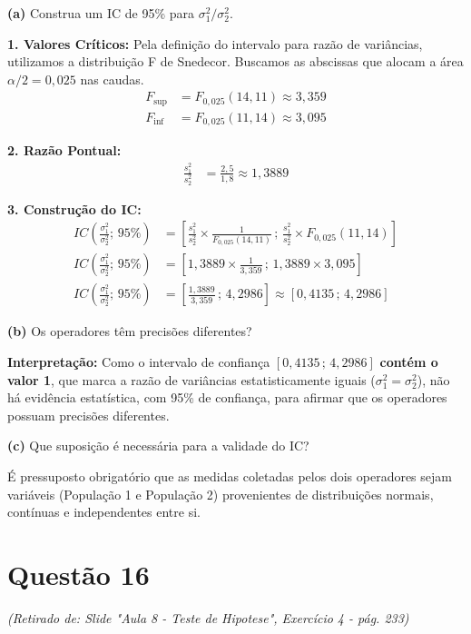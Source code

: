 \documentclass[12pt, a4paper]{article}
\begin{document}
\medskip\noindent\textbf{(a)} Construa um IC de 95\% para $\sigma^2_1 / \sigma^2_2$.

\noindent \textbf{1. Valores Críticos:} Pela definição do intervalo para razão de variâncias, utilizamos a distribuição F de Snedecor. Buscamos as abscissas que alocam a área $\alpha/2 = 0{,}025$ nas caudas.
\begin{align*}
F_{\text{sup}} &= F_{0{,}025}(14, 11) \approx 3{,}359 \\
F_{\text{inf}} &= F_{0{,}025}(11, 14) \approx 3{,}095
\end{align*}

\noindent \textbf{2. Razão Pontual:}
\begin{align*}
\frac{s^2_1}{s^2_2} &= \frac{2{,}5}{1{,}8} \approx \boxed{1{,}3889}
\end{align*}

\noindent \textbf{3. Construção do IC:}
\begin{align*}
IC\left(\frac{\sigma_1^2}{\sigma_2^2}; \, 95\%\right) &= \left[ \frac{s^2_1}{s^2_2} \times \frac{1}{F_{0{,}025}(14, 11)} \,;\, \frac{s^2_1}{s^2_2} \times F_{0{,}025}(11, 14) \right] \\
IC\left(\frac{\sigma_1^2}{\sigma_2^2}; \, 95\%\right) &= \left[ 1{,}3889 \times \frac{1}{3{,}359} \,;\, 1{,}3889 \times 3{,}095 \right] \\
IC\left(\frac{\sigma_1^2}{\sigma_2^2}; \, 95\%\right) &= \left[ \frac{1{,}3889}{3{,}359} \,;\, 4{,}2986 \right] \approx \boxed{[0{,}4135 \,;\, 4{,}2986]}
\end{align*}

\medskip\noindent\textbf{(b)} Os operadores têm precisões diferentes?

\noindent \textbf{Interpretação:} Como o intervalo de confiança $[0{,}4135 \,;\, 4{,}2986]$ \textbf{contém o valor 1}, que marca a razão de variâncias estatisticamente iguais ($\sigma_1^2 = \sigma_2^2$), não há evidência estatística, com 95\% de confiança, para afirmar que os operadores possuam precisões diferentes.

\medskip\noindent\textbf{(c)} Que suposição é necessária para a validade do IC?

\noindent É pressuposto obrigatório que as medidas coletadas pelos dois operadores sejam variáveis (População 1 e População 2) provenientes de distribuições normais, contínuas e independentes entre si.

\section*{Questão 16}
\textit{(Retirado de: Slide "Aula 8 - Teste de Hipotese", Exercício 4 - pág. 233)}
\end{document}
